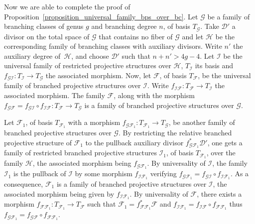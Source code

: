 \documentclass[JEP,XML,SOM,Unicode,NoEqCountersInSection,published]{cedram}
\theoremstyle{definition}
\theoremstyle{plain}
\begin{document}
Now we are able to complete the proof of Proposition~\ref{proposition_universal_family_bps_over_bc}.
Let $\mathcal G$ be a family of branching classes of genus $g$ and branching degree $n$, of basis $T_{\mathcal G}$.
Take $\mathcal D'$ a divisor on the total space of $\mathcal G$ that contains no fiber of $\mathcal G$ and let $\mathcal H$ be the corresponding family of branching classes with auxiliary divisors.
Write $n'$ the auxiliary degree of~$\mathcal H$, and choose $\mathcal D'$ such that $n+n' > 4g-4$.
Let $\mathcal I$ be the universal family of restricted projective structures over $\mathcal H$, $T_{\mathcal I}$ its basis and $f_{\mathcal G \mathcal I}: T_{\mathcal I} \to T_{\mathcal G}$ the associated morphism.
Now, let $\mathcal F$, of basis $T_{\mathcal F}$, be the universal family of branched projective structures over $\mathcal I$.
Write $f_{\mathcal I \mathcal F}: T_{\mathcal F} \to T_{\mathcal I}$ the associated morphism.
The family $\mathcal F$, along with the morphism $f_{\mathcal G \mathcal F} = f_{\mathcal G \mathcal I} \circ f_{\mathcal I \mathcal F}: T_{\mathcal F} \to T_{\mathcal G}$ is a family of branched projective structures over $\mathcal G$.

Let $\mathcal F_1$, of basis $T_{\mathcal F_1}$ with a morphism $f_{\mathcal G \mathcal F_1}: T_{\mathcal F_1} \to T_{\mathcal G}$, be another family of branched projective structures over $\mathcal G$.
By restricting the relative branched projective structure of $\mathcal F_1$ to the pullback auxiliary divisor $f_{\mathcal G \mathcal F_1}^* \mathcal D'$, one gets a family of restricted branched projective structures $\mathcal I_1$, of basis $T_{\mathcal F_1}$, over the family $\mathcal H$, the associated morphism being $f_{\mathcal G \mathcal F_1}$.
By universality of $\mathcal I$, the family $\mathcal I_1$ is the pullback of $\mathcal I$ by some morphism $f_{\mathcal I \mathcal F_1}$ verifying $f_{\mathcal G \mathcal F_1} = f_{\mathcal G \mathcal I} \circ f_{\mathcal I \mathcal F_1}$.
As a consequence, $\mathcal F_1$ is a family of branched projective structures over $\mathcal I$, the associated morphism being given by $f_{\mathcal I \mathcal F_1}$.
By universality of $\mathcal F$, there exists a morphism $f_{\mathcal F \mathcal F_1}: T_{\mathcal F_1} \to T_{\mathcal F}$ such that $\mathcal F_1 = f_{\mathcal F \mathcal F_1}^* \mathcal F$ and $f_{\mathcal I \mathcal F_1} = f_{\mathcal I \mathcal F} \circ f_{\mathcal F \mathcal F_1}$ thus $f_{\mathcal G \mathcal F_1} = f_{\mathcal G \mathcal F} \circ f_{\mathcal F \mathcal F_1}$.
\end{document}
